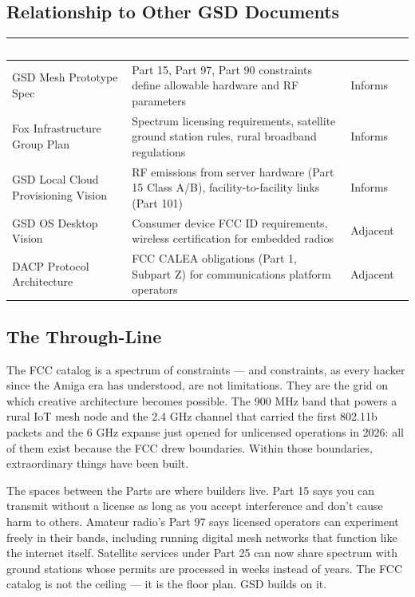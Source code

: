 \documentclass[11pt,letterpaper]{article}
\newcommand{\tableheader}[1]{\textbf{\sffamily\textcolor{white}{#1}}}
\begin{document}
\subsection{Relationship to Other GSD Documents}

\begin{center}
\begin{tabularx}{\textwidth}{L{5cm}XC{2.5cm}}
\toprule
{}
\tableheader{Document} & \tableheader{Relationship} & \tableheader{Direction} \\
\midrule
GSD Mesh Prototype Spec & Part 15, Part 97, Part 90 constraints define allowable hardware and RF parameters & Informs \\
Fox Infrastructure Group Plan & Spectrum licensing requirements, satellite ground station rules, rural broadband regulations & Informs \\
GSD Local Cloud Provisioning Vision & RF emissions from server hardware (Part 15 Class A/B), facility-to-facility links (Part 101) & Informs \\
GSD OS Desktop Vision & Consumer device FCC ID requirements, wireless certification for embedded radios & Adjacent \\
DACP Protocol Architecture & FCC CALEA obligations (Part 1, Subpart Z) for communications platform operators & Adjacent \\
\bottomrule
\end{tabularx}
\end{center}

\subsection{The Through-Line}

The FCC catalog is a spectrum of constraints --- and constraints, as every hacker since the Amiga era has understood, are not limitations. They are the grid on which creative architecture becomes possible. The 900 MHz band that powers a rural IoT mesh node and the 2.4 GHz channel that carried the first 802.11b packets and the 6 GHz expanse just opened for unlicensed operations in 2026: all of them exist because the FCC drew boundaries. Within those boundaries, extraordinary things have been built.

The spaces between the Parts are where builders live. Part 15 says you can transmit without a license as long as you accept interference and don't cause harm to others. Amateur radio's Part 97 says licensed operators can experiment freely in their bands, including running digital mesh networks that function like the internet itself. Satellite services under Part 25 can now share spectrum with ground stations whose permits are processed in weeks instead of years. The FCC catalog is not the ceiling --- it is the floor plan. GSD builds on it.
\end{document}
